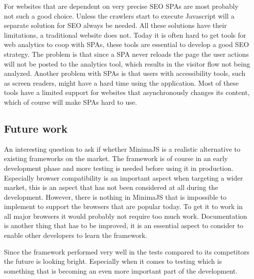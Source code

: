 For websites that are dependent on very precise SEO SPAs are most probably not such a good choice. Unless the crawlers start to execute Javascript will a separate solution for SEO always be needed. All these solutions have their limitations, a traditional website does not. Today it is often hard to get tools for web analytics to coop with SPAs, these tools are essential to develop a good SEO strategy. The problem is that since a SPA never reloads the page the user actions will not be posted to the analytics tool, which results in the visitor flow not being analyzed. Another problem with SPAs is that users with accessibility tools, such as screen readers, might have a hard time using the application. Most of these tools have a limited support for websites that asynchronously changes its content, which of course will make SPAs hard to use.


\subsection{Future work}

An interesting question to ask if whether MinimaJS is a realistic alternative to existing frameworks on the market. The framework is of course in an early development phase and more testing is needed before using it in production. Especially browser compatibility is an important aspect when targeting a wider market, this is an aspect that has not been considered at all during the development. However, there is nothing in MinimaJS that is impossible to implement to support the browsers that are popular today. To get it to work in all major browsers it would probably not require too much work. Documentation is another thing that has to be improved, it is an essential aspect to consider to enable other developers to learn the framework.

Since the framework performed very well in the tests compared to its competitors the future is looking bright. Especially when it comes to testing which is something that is becoming an even more important part of the development.
